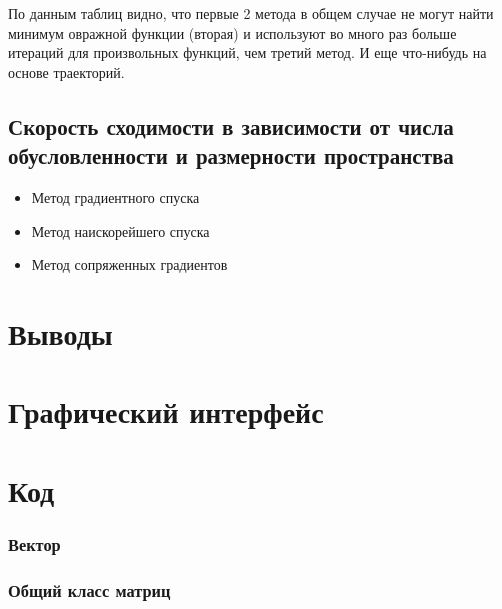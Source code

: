 По данным таблиц видно, что первые 2 метода в общем случае не могут найти минимум овражной функции (вторая) и используют во много раз больше итераций для произвольных функций, чем третий метод.
И еще что-нибудь на основе траекторий.

\subsection{Скорость сходимости в зависимости от числа обусловленности и размерности пространства}

\begin{itemize}
	\item Метод градиентного спуска

	\item Метод наискорейшего спуска

	\item Метод сопряженных градиентов
\end{itemize}

\section{Выводы}

\section{Графический интерфейс}

\section{Код}

\subsubsection{Вектор}
\newpage

\subsubsection{Общий класс матриц}
\newpage



